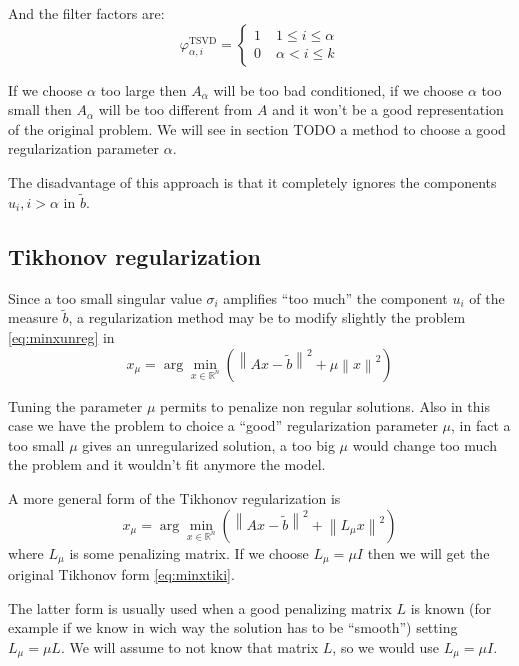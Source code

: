 \documentclass[a4paper,10pt]{article}
\theoremstyle{plain}
\theoremstyle{definition}
\theoremstyle{remark}
\newcommand{\pa}[1]{\left(#1\right)}
\newcommand{\norm}[1]{\left\|#1\right\|}
\begin{document}
And the filter factors are:
\begin{equation}
  \label{eq:TSVDfilter}
  \varphi ^{\text{TSVD}}_{\alpha,i} = \left\{
    \begin{matrix}
      1 \; &1\le i \le \alpha\\
      0 \; &\alpha < i \le k
    \end{matrix}
    \right.
\end{equation}

If we choose $\alpha$ too large then $A_\alpha$ will be too bad
conditioned, if we choose $\alpha$ too small then $A_\alpha$ will be
too different from $A$ and it won't be a good representation of the
original problem. We will see in section TODO a method to choose a
good regularization parameter $\alpha$.

The disadvantage of this approach is that it completely ignores the
components $u_i, i>\alpha$ in $\tilde b$.

\subsection{Tikhonov regularization}
\label{sec:tikhonov}

Since a too small singular value $\sigma _i$ amplifies ``too much''
the component $u_i$ of the measure $\tilde b$, a regularization method
may be to modify slightly the problem \ref{eq:minxunreg} in
\begin{equation}
  \label{eq:minxtiki}
  x_\mu = \arg\min _{x \in \mathbb{R}^n} \pa{ \norm{Ax -\tilde b}^2 + \mu\norm{x}^2}
\end{equation}

Tuning the parameter $\mu$ permits to penalize non regular
solutions. Also in this case we have the problem to choice a ``good''
regularization parameter $\mu$, in fact a too small $\mu$ gives an
unregularized solution, a too big $\mu$ would change too much the
problem and it wouldn't fit anymore the model.

A more general form of the Tikhonov regularization is
\begin{equation}
  \label{eq:minxtikgen}
  x_\mu = \arg\min _{x \in \mathbb{R}^n} \pa{ \norm{Ax -\tilde b}^2 +
    \norm{L_\mu x}^2}
\end{equation}
where $L_\mu$ is some penalizing matrix. If we choose $L_\mu = \mu
I$ then we will get the original Tikhonov form \ref{eq:minxtiki}.

The latter form is usually used when a good penalizing matrix $L$ is
known (for example if we know in wich way the solution has to be
``smooth'') setting $L_\mu = \mu L$. We will assume to not know that
matrix $L$, so we would use $L_\mu = \mu I$.
\end{document}
